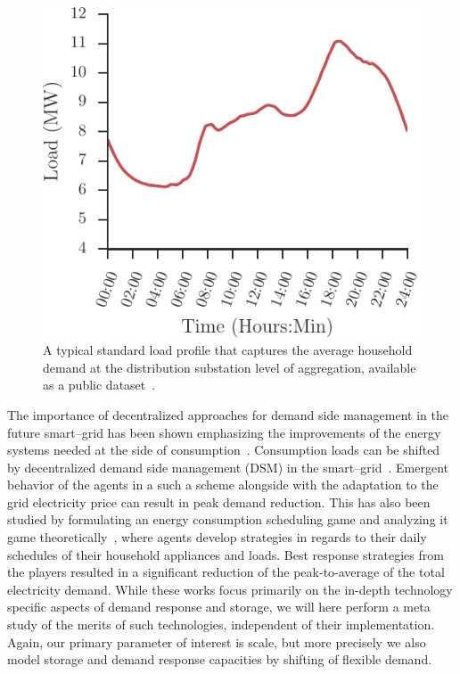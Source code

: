 \documentclass[conference]{IEEEtran}
\begin{document}
\begin{figure}[t!]
\centering
\includegraphics[width=0.8\columnwidth]{figures/slp.pdf}
\caption{A typical standard load profile that captures the average household demand at the distribution substation level of aggregation, available as a public dataset~\cite{SLPsource}.}
\label{fig:slp}
\end{figure}


The importance of decentralized approaches for demand side management in the future smart--grid has been shown emphasizing the improvements of the energy systems needed at the side of consumption~\cite{palensky2011demand}. Consumption loads can be shifted by decentralized demand side management (DSM) in the smart--grid~\cite{Ramchurn2011a}. Emergent behavior of the agents in a such a scheme alongside with the adaptation to the grid electricity price can result in peak demand reduction. This has also been studied by formulating an energy consumption scheduling game and analyzing it game theoretically~\cite{Mohsenian-Rad2010}, where agents develop strategies in regards to their daily schedules of their household appliances and loads. Best response strategies from the players resulted in a significant reduction of the peak-to-average of the total electricity demand. 
While these works focus primarily on the in-depth technology specific aspects of demand response and storage, we will here perform a meta study of the merits of such technologies, independent of their implementation. Again, our primary parameter of interest is scale, but more precisely we also model storage and demand response capacities by shifting of flexible demand.
\end{document}
